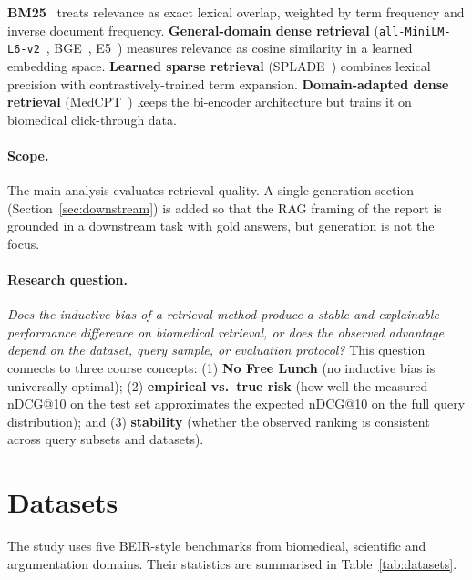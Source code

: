 \documentclass[11pt,a4paper]{article}
\begin{document}
\textbf{BM25}~\cite{Robertson2009BM25} treats relevance as exact lexical
overlap, weighted by term frequency and inverse document frequency.
\textbf{General-domain dense retrieval} (\texttt{all-MiniLM-L6-v2}~\cite{MiniLM},
BGE~\cite{Xiao2023BGE}, E5~\cite{Wang2022E5}) measures relevance as cosine
similarity in a learned embedding space. \textbf{Learned sparse retrieval}
(SPLADE~\cite{Formal2021SPLADE}) combines lexical precision with
contrastively-trained term expansion. \textbf{Domain-adapted dense
retrieval} (MedCPT~\cite{Jin2023MedCPT}) keeps the bi-encoder architecture
but trains it on biomedical click-through data.

\paragraph{Scope.}
The main analysis evaluates retrieval quality. A single generation
section (Section~\ref{sec:downstream}) is added so that the RAG framing
of the report is grounded in a downstream task with gold answers, but
generation is not the focus.

\paragraph{Research question.}
\emph{Does the inductive bias of a retrieval method produce a stable and
explainable performance difference on biomedical retrieval, or does the
observed advantage depend on the dataset, query sample, or evaluation
protocol?} This question connects to three course concepts:
(1) \textbf{No Free Lunch} (no inductive bias is universally optimal);
(2) \textbf{empirical vs.\ true risk} (how well the measured nDCG@10
on the test set approximates the expected nDCG@10 on the full query
distribution); and (3) \textbf{stability} (whether the observed
ranking is consistent across query subsets and datasets).

\section{Datasets}
\label{sec:datasets}

The study uses five BEIR-style benchmarks from biomedical, scientific
and argumentation domains. Their statistics are summarised in
Table~\ref{tab:datasets}.
\end{document}
